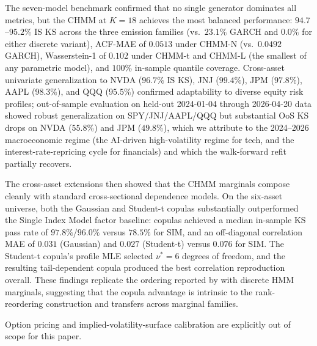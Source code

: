 The seven-model benchmark confirmed that no single generator dominates all metrics, but the CHMM at $K = 18$ achieves the most balanced performance: $94.7$--$95.2\%$ IS KS across the three emission families (vs.\ $23.1\%$ GARCH and $0.0\%$ for either discrete variant), ACF-MAE of $0.0513$ under CHMM-N (vs.\ $0.0492$ GARCH), Wasserstein-1 of $0.102$ under CHMM-t and CHMM-L (the smallest of any parametric model), and $100\%$ in-sample quantile coverage.
Cross-asset univariate generalization to NVDA ($96.7\%$ IS KS), JNJ ($99.4\%$), JPM ($97.8\%$), AAPL ($98.3\%$), and QQQ ($95.5\%$) confirmed adaptability to diverse equity risk profiles; out-of-sample evaluation on held-out 2024-01-04 through 2026-04-20 data showed robust generalization on SPY/JNJ/AAPL/QQQ but substantial OoS KS drops on NVDA ($55.8\%$) and JPM ($49.8\%$), which we attribute to the 2024--2026 macroeconomic regime (the AI-driven high-volatility regime for tech, and the interest-rate-repricing cycle for financials) and which the walk-forward refit partially recovers.

The cross-asset extensions then showed that the CHMM marginals compose cleanly with standard cross-sectional dependence models.
On the six-asset universe, both the Gaussian and Student-t copulas substantially outperformed the Single Index Model factor baseline: copulas achieved a median in-sample KS pass rate of $97.8\%$/$96.0\%$ versus $78.5\%$ for SIM, and an off-diagonal correlation MAE of $0.031$ (Gaussian) and $0.027$ (Student-t) versus $0.076$ for SIM.
The Student-t copula's profile MLE selected $\nu^* = 6$ degrees of freedom, and the resulting tail-dependent copula produced the best correlation reproduction overall.
These findings replicate the ordering reported by \citet{alswaidan2026hybrid} with discrete HMM marginals, suggesting that the copula advantage is intrinsic to the rank-reordering construction and transfers across marginal families.

Option pricing and implied-volatility-surface calibration are explicitly out of scope for this paper.

